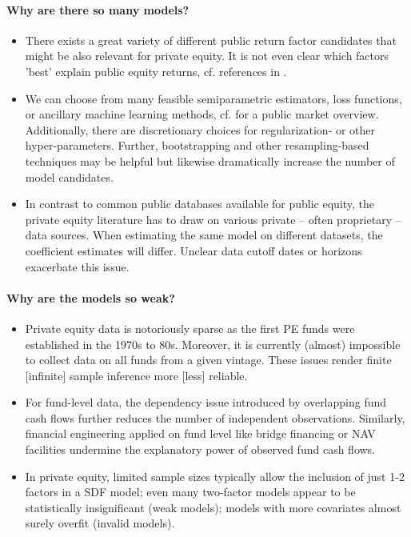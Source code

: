 \documentclass[12pt]{article}
\begin{document}
\paragraph{Why are there so many models?}

\begin{itemize}
	\item There exists a great variety of different public return factor candidates that might be also relevant for private equity. It is not even clear which factors 'best' explain public equity returns, cf. references in \cite{KN20}. 
	\item We can choose from many feasible semiparametric estimators, loss functions, or ancillary machine learning methods, cf. \cite{GKX20} for a public market overview.
	Additionally, there are discretionary choices for regularization- or other hyper-parameters.
	Further, bootstrapping and other resampling-based techniques may be helpful but likewise dramatically increase the number of model candidates.
	\item In contrast to common public databases available for public equity, the private equity literature has to draw on various private -- often proprietary -- data sources. When estimating the same model on different datasets, the coefficient estimates will differ. Unclear data cutoff dates or horizons exacerbate this issue.
\end{itemize}

\paragraph{Why are the models so weak?}

\begin{itemize}
	\item Private equity data is notoriously sparse as the first PE funds were established in the 1970s to 80s. Moreover, it is currently (almost) impossible to collect data on all funds from a given vintage. These issues render finite [infinite] sample inference more [less] reliable.
	\item For fund-level data, the dependency issue introduced by overlapping fund cash flows further reduces the number of independent observations. Similarly, financial engineering applied on fund level like bridge financing or NAV facilities undermine the explanatory power of observed fund cash flows.
	\item In private equity, limited sample sizes typically allow the inclusion of just 1-2 factors in a SDF model; even many two-factor models appear to be statistically insignificant (weak models); models with more covariates almost surely overfit (invalid models).
\end{itemize}
\end{document}
